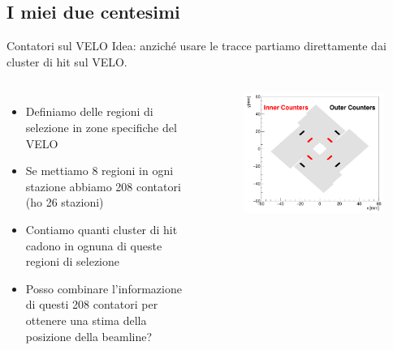 \documentclass[
10pt,
aspectratio=169,
]{beamer}
\begin{document}
\subsection{I miei due centesimi}
\begin{frame}{Contatori sul VELO}
    Idea: anziché usare le tracce partiamo direttamente dai cluster di hit sul VELO.
    \begin{columns}
        \begin{itemize}
            \item Definiamo delle regioni di selezione in zone specifiche del VELO
            \item Se mettiamo 8 regioni in ogni stazione abbiamo 208 contatori (ho 26 stazioni)
            \item Contiamo quanti cluster di hit cadono in ognuna di queste regioni di selezione
            \item Posso combinare l'informazione di questi 208 contatori per ottenere una stima della posizione della beamline?
        \end{itemize}

        \begin{figure}
            \centering
            \includegraphics[width=\textwidth]{figures/counters.png}
        \end{figure}
    \end{columns}
\end{frame}
\end{document}
